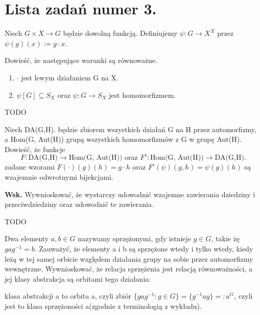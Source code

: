 \section{Lista zadań numer 3.}	
\begin{problem}[1]

	Niech $G\times X\rightarrow G$ będzie dowolną funkcją. Definiujemy $\psi: G \rightarrow X^{X}$ przez $\psi(g)(x) := g\cdot x$.

	Dowieść, że następujące warunki są równoważne.
	\begin{enumerate}[label=\alph*)]
		\item $\cdot $ jest lewym działaniem G na X.
		\item $\psi[G] \subseteq S_{X}$ oraz $\psi: G\rightarrow S_{X}$ jest homomorfizmem.
	\end{enumerate}
\end{problem}
\begin{solution}

	TODO		
\end{solution}
\begin{problem}[2]

	Niech DA(G,H). będzie zbiorem wszystkich działań G na H przez automorfizmy, a Hom(G, Aut(H)) grupą wszystkich homomorfizmów z G w grupę Aut(H). Dowieść, że funkcje
	 \[
	F: \text{DA(G,H)}\rightarrow \text{Hom(G, Aut(H)) oraz } F': \text{Hom(G, Aut(H))} \rightarrow \text{DA(G,H)}
	.\] 
	zadane wzorami $F(\cdot )(g)(h) = g\cdot h$ oraz $F'(\psi)(g,h) = \psi(g)(h)$ są wzajemnie odwrotnymi bijekcjami.

	\textbf{Wsk.} Wywnioskować, że wystarczy udowodnić wzajemne zawierania dziedziny i przeciwdziedziny  oraz udowodnić te zawierania.
\end{problem}
\begin{solution}

	TODO	
\end{solution}
\begin{problem}[3]

	Dwa elementy $a,b \in G$ nazywamy sprzężonymi, gdy istnieje $g \in G$, takie żę $gag^{-1}=b$. Zauważyć, że elementy a i b są sprzężone wtedy i tylko wtedy, kiedy leżą w tej samej orbicie względem działania grupy na sobie przez automorfizmy wewnętrzne. Wywnioskować, że relacja sprzężenia jest relacją równoważności, a jej klasy abstrakcja są orbitami tego działania: 

	klasa abstrakcji a to orbita a, czyli zbiór $\{gag^{-1}: g\in G\} = \{g^{-1}ag\} =: a^{G}$, czyli jest to klasa sprzężoności a(zgodnie z terminologią z wykładu).
\end{problem}
